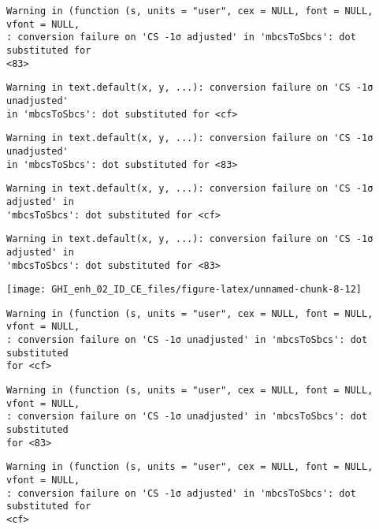 \documentclass[
  10pt,
  a4paper,oneside]{article}
\begin{document}
\begin{verbatim}
Warning in (function (s, units = "user", cex = NULL, font = NULL, vfont = NULL,
: conversion failure on 'CS -1σ adjusted' in 'mbcsToSbcs': dot substituted for
<83>
\end{verbatim}

\begin{verbatim}
Warning in text.default(x, y, ...): conversion failure on 'CS -1σ unadjusted'
in 'mbcsToSbcs': dot substituted for <cf>
\end{verbatim}

\begin{verbatim}
Warning in text.default(x, y, ...): conversion failure on 'CS -1σ unadjusted'
in 'mbcsToSbcs': dot substituted for <83>
\end{verbatim}

\begin{verbatim}
Warning in text.default(x, y, ...): conversion failure on 'CS -1σ adjusted' in
'mbcsToSbcs': dot substituted for <cf>
\end{verbatim}

\begin{verbatim}
Warning in text.default(x, y, ...): conversion failure on 'CS -1σ adjusted' in
'mbcsToSbcs': dot substituted for <83>
\end{verbatim}

\begin{center}\texttt{[image: GHI\_enh\_02\_ID\_CE\_files/figure-latex/unnamed-chunk-8-12]} \end{center}

\begin{verbatim}
Warning in (function (s, units = "user", cex = NULL, font = NULL, vfont = NULL,
: conversion failure on 'CS -1σ unadjusted' in 'mbcsToSbcs': dot substituted
for <cf>
\end{verbatim}

\begin{verbatim}
Warning in (function (s, units = "user", cex = NULL, font = NULL, vfont = NULL,
: conversion failure on 'CS -1σ unadjusted' in 'mbcsToSbcs': dot substituted
for <83>
\end{verbatim}

\begin{verbatim}
Warning in (function (s, units = "user", cex = NULL, font = NULL, vfont = NULL,
: conversion failure on 'CS -1σ adjusted' in 'mbcsToSbcs': dot substituted for
<cf>
\end{verbatim}
\end{document}
